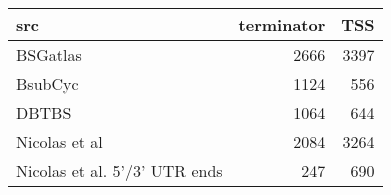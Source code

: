 \centering
\begin{tabular}{lrr}
\toprule
src & terminator & TSS\\
\midrule
BSGatlas & 2666 & 3397\\
BsubCyc & 1124 & 556\\
DBTBS & 1064 & 644\\
Nicolas et al & 2084 & 3264\\
Nicolas et al. 5'/3' UTR ends & 247 & 690\\
\bottomrule
\end{tabular}
